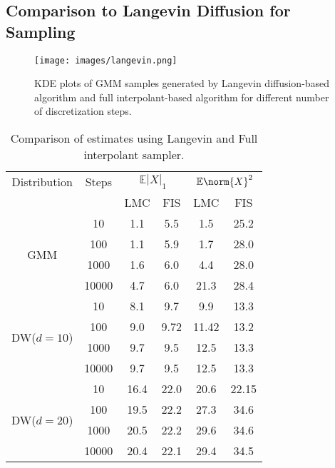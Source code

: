 \subsection{Comparison to Langevin Diffusion for Sampling}
\begin{figure}
  \centering
  \texttt{[image: images/langevin.png]}
  \caption{KDE plots of GMM samples generated by Langevin diffusion-based algorithm and full interpolant-based algorithm for different number of discretization steps.}
  \label{fig:langevin}
\end{figure}

\begin{table}
  \caption{Comparison of estimates using Langevin and Full interpolant sampler.}
  \label{tab:langevin_estimates}
  \centering
  \begin{tabular}{cccccc}
    \toprule
     Distribution & Steps & \multicolumn{2}{c}{$\mathbb{E}|X|_1$} & \multicolumn{2}{c}{$\mathbb{E}\norm{X}^2$} \\
     \cmidrule(r){3-6}
     & & LMC & FIS & LMC & FIS\\
     \midrule
    \multirow{4}{*}{GMM} & 10 & 1.1 & 5.5 & 1.5 & 25.2\\
    & 100 & 1.1 & 5.9 & 1.7 & 28.0\\
    & 1000 & 1.6 & 6.0 & 4.4 & 28.0\\
    & 10000 & 4.7 & 6.0 & 21.3 & 28.4\\
    \midrule
    \multirow{4}{*}{DW($d=10$)} & 10 & 8.1 & 9.7 & 9.9 & 13.3\\
    & 100 & 9.0 & 9.72 & 11.42 & 13.2\\
    & 1000 & 9.7 & 9.5 & 12.5 & 13.3\\
    & 10000 & 9.7 & 9.5 & 12.5 & 13.3\\
    \midrule
    \multirow{4}{*}{DW($d=20$)} & 10 & 16.4 & 22.0 & 20.6 & 22.15\\
    & 100 & 19.5 & 22.2 & 27.3 & 34.6\\
    & 1000 & 20.5 & 22.2 & 29.6 & 34.6\\
    & 10000 & 20.4 & 22.1 & 29.4 & 34.5\\
    \bottomrule
  \end{tabular}
\end{table}


